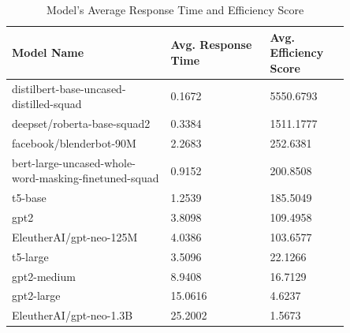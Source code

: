 \documentclass{wseas}
\begin{document}
\begin{table}[htbp]
  \centering
  \caption{Model's Average Response Time and Efficiency Score} %
  \label{tab:model_efficiency_scores}  %
  \begin{tabular}{|p{0.4\linewidth}|p{0.25\linewidth}|p{0.2\linewidth}|}
    \hline
    \textbf{Model Name} & \textbf{Avg. Response Time} & \textbf{Avg. Efficiency Score} \\
    \hline
    distilbert-base-uncased-distilled-squad & 0.1672 & 5550.6793 \\
    \hline
    deepset/roberta-base-squad2 & 0.3384 & 1511.1777 \\
    \hline
    facebook/blenderbot-90M & 2.2683 & 252.6381 \\
    \hline
    bert-large-uncased-whole-word-masking-finetuned-squad & 0.9152 & 200.8508 \\
    \hline
    t5-base & 1.2539 & 185.5049 \\
    \hline
    gpt2 & 3.8098 & 109.4958 \\
    \hline
    EleutherAI/gpt-neo-125M & 4.0386 & 103.6577 \\
    \hline
    t5-large & 3.5096 & 22.1266 \\
    \hline
    gpt2-medium & 8.9408 & 16.7129 \\
    \hline
    gpt2-large & 15.0616 & 4.6237 \\
    \hline
    EleutherAI/gpt-neo-1.3B & 25.2002 & 1.5673 \\
    \hline
  \end{tabular}
\end{table}
\end{document}
